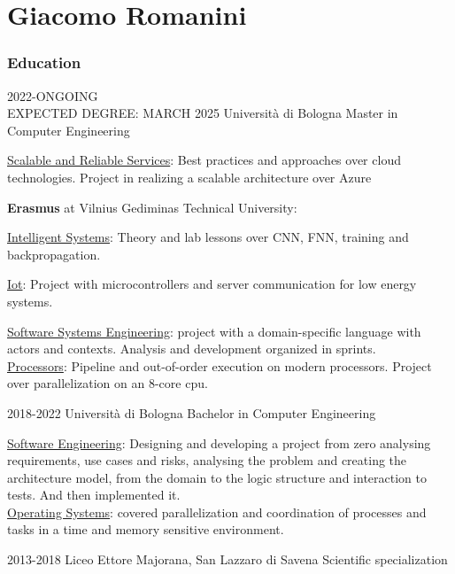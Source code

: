 \documentclass{tccv}
\begin{document}
\part{Giacomo Romanini}


\section{Education}

\hfill

\begin{eventlist}

      \item{2022-ONGOING\\EXPECTED DEGREE: MARCH 2025}
            {Università di Bologna}
            {Master in Computer Engineering}

      \underline{Scalable and Reliable Services}: Best practices and approaches over cloud technologies. Project in realizing a scalable architecture over Azure

      \textbf{Erasmus} at Vilnius Gediminas Technical University:

      \quad \underline{Intelligent Systems}: Theory and lab lessons over CNN, FNN, training and backpropagation.

      \quad \underline{Iot}: Project with microcontrollers and server communication for low energy systems.

      \underline{Software Systems Engineering}: project with a domain-specific language with actors and contexts. Analysis and development organized in sprints.\\
      \underline{Processors}: Pipeline and out-of-order execution on modern processors. Project over parallelization on an 8-core cpu.

      \item{2018-2022}
            {Università di Bologna}
            {Bachelor in Computer Engineering}

      \underline{Software Engineering}: Designing and developing a project from zero analysing requirements, use cases and risks, analysing the problem and creating the architecture model, from the domain to the logic structure and interaction to tests. And then implemented it.\\
      \underline{Operating Systems}: covered parallelization and coordination of processes and tasks in a time and memory sensitive environment.

      \item{2013-2018}
            {Liceo Ettore Majorana, San Lazzaro di Savena}
            {Scientific specialization}
\end{eventlist}
\end{document}
